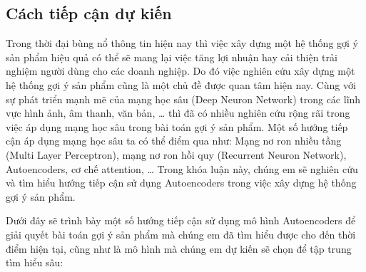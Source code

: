 \documentclass{article}[14pt]
\begin{document}
{    \subsection{Cách tiếp cận dự kiến}
    

   Trong thời đại bùng nổ thông tin hiện nay thì việc xây dựng một hệ thống gợi 
   ý sản phẩm hiệu quả có thể sẽ mang lại việc tăng lợi nhuận hay cải thiện trải 
   nghiệm người dùng cho các doanh nghiệp. Do đó việc nghiên cứu xây dựng một hệ 
   thống gợi ý sản phẩm cũng là một chủ đề được quan tâm hiện nay. Cùng với sự 
   phát triển mạnh mẽ của mạng học sâu (Deep Neuron Network) trong các lĩnh vực 
   hình ảnh, âm thanh, văn bản, … thì đã có nhiều nghiên cứu rộng rãi trong việc 
   áp dụng mạng học sâu trong bài toán gợi ý sản phẩm. Một số hướng tiếp cận áp 
   dụng mạng học sâu ta có thể điểm qua như: Mạng nơ ron nhiều tầng (Multi Layer 
   Perceptron), mạng nơ ron hồi quy (Recurrent Neuron Network), Autoencoders, cơ chế attention, … 
   Trong khóa luận này, chúng em sẽ nghiên cứu và tìm hiểu hướng tiếp cận sử 
   dụng Autoencoders trong việc xây dựng hệ thống gợi ý sản phẩm.  
   
   Dưới đây sẽ trình bày một số hướng tiếp cận sử dụng mô hình Autoencoders để 
   giải quyết bài toán gợi ý sản phẩm mà chúng em đã tìm hiểu được cho đến thời 
   điểm hiện tại, cũng như là mô hình mà chúng em dự kiến sẽ chọn để tập trung 
   tìm hiểu sâu:
   
   
   
}
\end{document}
